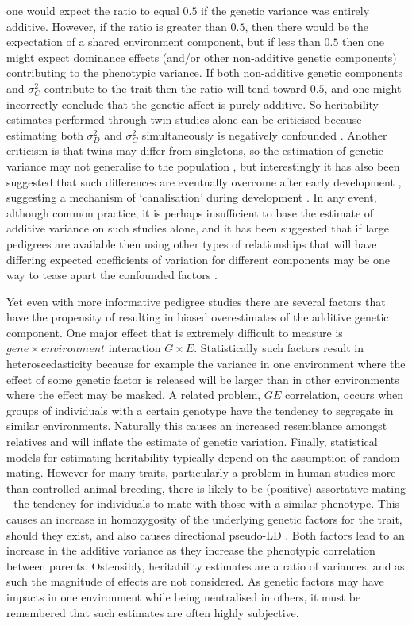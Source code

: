 one would expect the ratio to equal $0.5$ if the genetic variance was entirely additive. However, if the ratio is greater than $0.5$, then there would be the expectation of a shared environment component, but if less than $0.5$ then one might expect dominance effects (and/or other non-additive genetic components) contributing to the phenotypic variance. If both non-additive genetic components and $\sigma^{2}_{C}$ contribute to the trait then the ratio will tend toward $0.5$, and one might incorrectly conclude that the genetic affect is purely additive. So heritability estimates performed through twin studies alone can be criticised because estimating both $\sigma^{2}_{D}$ and $\sigma^{2}_{C}$ simultaneously is negatively confounded \citep{Evans2002}. Another criticism is that twins may differ from singletons, so the estimation of genetic variance may not generalise to the population \citep{Petterson1993, Phillips1993, Record1970}, but interestingly it has also been suggested that such differences are eventually overcome after early development \citep{Posthuma2000}, suggesting a mechanism of `canalisation' during development \citep{Waddington1942}. In any event, although common practice, it is perhaps insufficient to base the estimate of additive variance on such studies alone, and it has been suggested that if large pedigrees are available then using other types of relationships that will have differing expected coefficients of variation for different components \citep{Hill1982} may be one way to tease apart the confounded factors \citep{Haley1981}.

Yet even with more informative pedigree studies there are several factors that have the propensity of resulting in biased overestimates of the additive genetic component. One major effect that is extremely difficult to measure is $gene \times environment$ interaction $G \times E$. Statistically such factors result in heteroscedasticity because for example the variance in one environment where the effect of some genetic factor is released will be larger than in other environments where the effect may be masked. A related problem, $GE$ correlation, occurs when groups of individuals with a certain genotype have the tendency to segregate in similar environments. Naturally this causes an increased resemblance amongst relatives and will inflate the estimate of genetic variation. Finally, statistical models for estimating heritability typically depend on the assumption of random mating. However for many traits, particularly a problem in human studies more than controlled animal breeding, there is likely to be (positive) assortative mating - the tendency for individuals to mate with those with a similar phenotype. This causes an increase in homozygosity of the underlying genetic factors for the trait, should they exist, and also causes directional pseudo-LD \citep{Kimura1965}. Both factors lead to an increase in the additive variance as they increase the phenotypic correlation between parents. Ostensibly, heritability estimates are a ratio of variances, and as such the magnitude of effects are not considered. As genetic factors may have impacts in one environment while being neutralised in others, it must be remembered that such estimates are often highly subjective.


